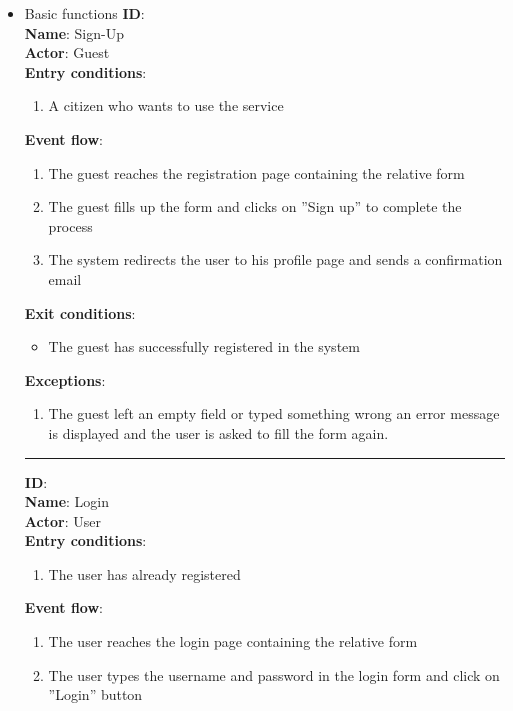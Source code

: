 \begin{enumerate}
\begin{itemize}
    \item{Basic functions}
		\textbf{ID}:  \\
		\textbf{Name}: Sign-Up \\
		\textbf{Actor}: Guest \\
		\textbf{Entry conditions}:
		\begin{enumerate}
			\item{A citizen who wants to use the service}
		\end{enumerate}
		\textbf{Event flow}:
		\begin{enumerate}
			\item{The guest reaches the registration page containing the relative form}
			\item{The guest ﬁlls up the form and clicks on ”Sign up” to complete the process}
			\item{The system redirects the user to his proﬁle page and sends a conﬁrmation email}
		\end{enumerate}
		\textbf{Exit conditions}:
		\begin{itemize}
			\item{The guest has successfully registered in the system}
		\end{itemize}
		\textbf{Exceptions}:
		\begin{enumerate}
      		\item{The guest left an empty ﬁeld or typed something wrong an error message is displayed and the user is asked to ﬁll the form again.}
 		   \end{enumerate}
		\rule{\linewidth}{0.4pt}
		\textbf{ID}:  \\
		\textbf{Name}: Login \\
		\textbf{Actor}: User \\
		\textbf{Entry conditions}:
		\begin{enumerate}
			\item{The user has already registered}
		\end{enumerate}
		\textbf{Event flow}:
		\begin{enumerate}
			\item{The user reaches the login page containing the relative form}
			\item{The user types the username and password in the login form and click on ”Login” button}

\end{enumerate}
\end{itemize}
\end{enumerate}
